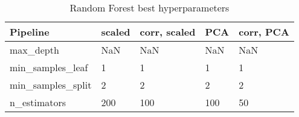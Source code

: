 \begin{table}[!htb]
\centering
\begin{tabular}{lllll}
\toprule
Pipeline & scaled & corr, scaled & PCA & corr, PCA \\
\midrule
max\_depth & NaN & NaN & NaN & NaN \\
min\_samples\_leaf & 1 & 1 & 1 & 1 \\
min\_samples\_split & 2 & 2 & 2 & 2 \\
n\_estimators & 200 & 100 & 100 & 50 \\
\bottomrule
\end{tabular}
\caption{Random Forest best hyperparameters}
\label{table-random-forest-params}
\end{table}
